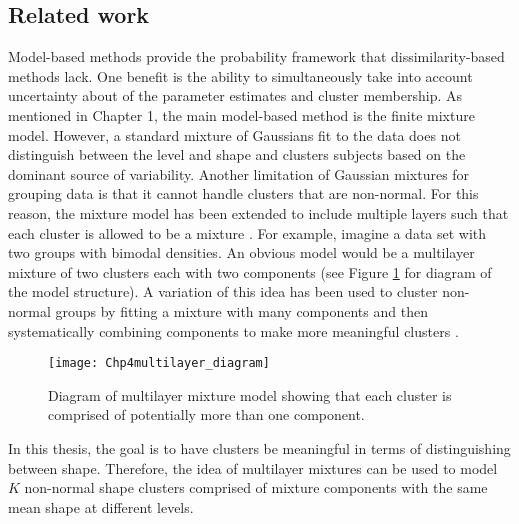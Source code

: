 \subsection{Related work}
Model-based methods provide the probability framework that dissimilarity-based methods lack. One benefit is the ability to simultaneously take into account uncertainty about of the parameter estimates and cluster membership. As mentioned in Chapter 1, the main model-based method is the finite mixture model. However, a standard mixture of Gaussians fit to the data does not distinguish between the level and shape and clusters subjects based on the dominant source of variability. Another limitation of Gaussian mixtures for grouping data is that it cannot handle clusters that are non-normal. For this reason, the mixture model has been extended to include multiple layers such that each cluster is allowed to be a mixture \cite{li2005}.  For example, imagine a data set with two groups with bimodal densities. An obvious model would be a multilayer mixture of two clusters each with two components (see Figure \ref{fig:dia} for diagram of the model structure). A variation of this idea has been used to cluster non-normal groups by fitting a mixture with many components and then systematically combining components to make more meaningful clusters \cite{hennig2010}. 
\begin{figure}[h]
\begin{center}
\texttt{[image: Chp4multilayer\_diagram]}
\end{center}
\label{fig:dia}
\caption{Diagram of multilayer mixture model showing that each cluster is comprised of potentially more than one component.}
\end{figure}

In this thesis, the goal is to have clusters be meaningful in terms of distinguishing between shape. Therefore, the idea of multilayer mixtures can be used to model $K$ non-normal shape clusters comprised of mixture components with the same mean shape at different levels.


